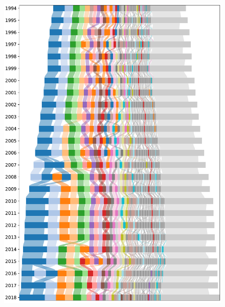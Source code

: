 \documentclass[varwidth, border={0pt 0pt 235pt 0pt}]{standalone}
\begin{document}
	
	\begin{figure}
\centering
	\includegraphics{../../graphics/sankey_us_0-0_1-0_-1_a-infomap_n100_m1-0_s0_c1000.pdf}
	\end{figure}
	
\end{document}
